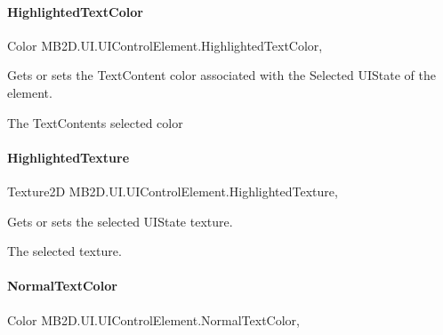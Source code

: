 \paragraph{\texorpdfstring{Highlighted\+Text\+Color}{HighlightedTextColor}}
{\footnotesize\ttfamily Color M\+B2\+D.\+U\+I.\+U\+I\+Control\+Element.\+Highlighted\+Text\+Color\hspace{0.3cm}{\ttfamily [get]}, {\ttfamily [set]}}



Gets or sets the Text\+Content color associated with the Selected U\+I\+State of the element. 

The Text\+Contents selected color\hypertarget{class_m_b2_d_1_1_u_i_1_1_u_i_control_element_a0caea5b8e0a7b1af0a18bafff1d986b0}{}\label{class_m_b2_d_1_1_u_i_1_1_u_i_control_element_a0caea5b8e0a7b1af0a18bafff1d986b0} 
\paragraph{\texorpdfstring{Highlighted\+Texture}{HighlightedTexture}}
{\footnotesize\ttfamily Texture2D M\+B2\+D.\+U\+I.\+U\+I\+Control\+Element.\+Highlighted\+Texture\hspace{0.3cm}{\ttfamily [get]}, {\ttfamily [set]}}



Gets or sets the selected U\+I\+State texture. 

The selected texture.\hypertarget{class_m_b2_d_1_1_u_i_1_1_u_i_control_element_a3f7eb009aa193cb3daf4057290b7d4ce}{}\label{class_m_b2_d_1_1_u_i_1_1_u_i_control_element_a3f7eb009aa193cb3daf4057290b7d4ce} 
\paragraph{\texorpdfstring{Normal\+Text\+Color}{NormalTextColor}}
{\footnotesize\ttfamily Color M\+B2\+D.\+U\+I.\+U\+I\+Control\+Element.\+Normal\+Text\+Color\hspace{0.3cm}{\ttfamily [get]}, {\ttfamily [set]}}



